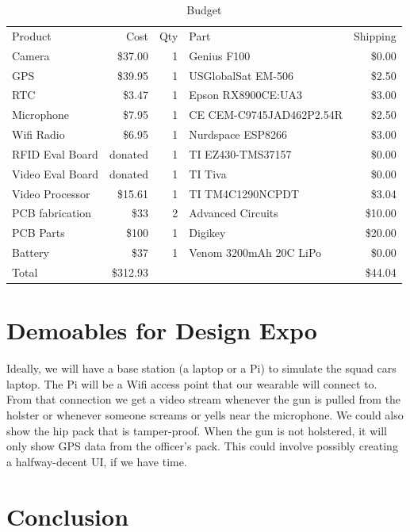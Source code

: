 \documentclass[12pt]{article}
\begin{document}
\begin{table}[h!]
    \centering
    \caption{Budget}
    \begin{tabular}{lrrlr}
        Product & Cost & Qty & Part & Shipping\\
        Camera & \$37.00 & 1 & Genius F100 & \$0.00\\
        GPS & \$39.95 & 1 & USGlobalSat EM-506 & \$2.50\\
        RTC & \$3.47 & 1 & Epson RX8900CE:UA3 & \$3.00\\
        Microphone & \$7.95 & 1 & CE CEM-C9745JAD462P2.54R & \$2.50\\
        Wifi Radio & \$6.95 & 1 & Nurdspace ESP8266 & \$3.00\\
        RFID Eval Board & donated & 1 & TI EZ430-TMS37157 & \$0.00\\
        Video Eval Board & donated & 1 & TI Tiva & \$0.00\\
        Video Processor & \$15.61 & 1 & TI TM4C1290NCPDT & \$3.04\\
        PCB fabrication & \$33 & 2 & Advanced Circuits & \$10.00\\
        PCB Parts & \$100 & 1 & Digikey & \$20.00\\
        Battery & \$37 & 1 & Venom 3200mAh 20C LiPo & \$0.00\\
        Total & \$312.93 & & & \$44.04\\
    \end{tabular}
\end{table}

\section{Demoables for Design Expo}

Ideally, we will have a base station (a laptop or a Pi) to simulate the squad
cars laptop. The Pi will be a Wifi access point that our wearable will connect
to. From that connection we get a video stream whenever the gun is pulled from
the holster or whenever someone screams or yells near the microphone. We could
also show the hip pack that is tamper-proof. When the gun is not holstered, it
will only show GPS data from the officer’s pack. This could involve possibly
creating a halfway-decent UI, if we have time.

\section{Conclusion}
\end{document}
